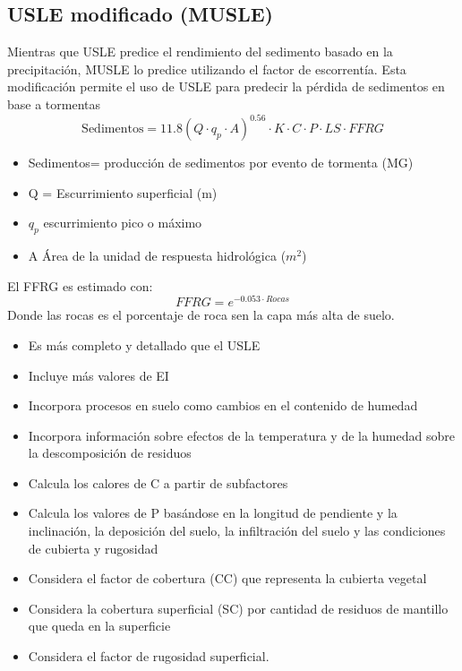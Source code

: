     \subsection{USLE modificado (MUSLE)}
    Mientras que USLE predice el rendimiento del sedimento basado en la precipitación, MUSLE lo predice utilizando el factor de escorrentía. Esta modificación permite el uso de USLE para predecir la pérdida de sedimentos en base a tormentas
    \begin{equation}
            \text{Sedimentos} = 11.8\left(Q\cdot q_p\cdot A\right)^{0.56} \cdot K \cdot C \cdot P \cdot LS \cdot FFRG
    \end{equation}
    \begin{notation}
        \begin{itemize}
            \item Sedimentos= producción de sedimentos por evento de tormenta (MG)
            \item Q = Escurrimiento superficial (m)
            \item $q_p$ escurrimiento pico o máximo
            \item A Área de la unidad de respuesta hidrológica ($m^2$)
        \end{itemize}
    \end{notation}
    El FFRG es estimado con:
    \begin{equation}
        FFRG = e^{ -0.053 \cdot Rocas}
    \end{equation}
    Donde las rocas es el porcentaje de roca sen la capa más alta de suelo.
    \begin{itemize}
        \item Es más completo y detallado que el USLE
        \item Incluye más valores de EI
        \item Incorpora procesos en suelo como cambios en el contenido de humedad
        \item Incorpora información sobre efectos de la temperatura y de la humedad sobre la descomposición de residuos
        \item Calcula los calores de C a partir de subfactores
        \item Calcula los valores de P basándose en la longitud de pendiente y la inclinación, la deposición del suelo, la infiltración del suelo y las condiciones de cubierta y rugosidad
        \item Considera el factor de cobertura (CC) que representa la cubierta vegetal
        \item Considera la cobertura superficial (SC) por cantidad de residuos de mantillo que queda en la superficie
        \item Considera el factor de rugosidad superficial.
    \end{itemize}
